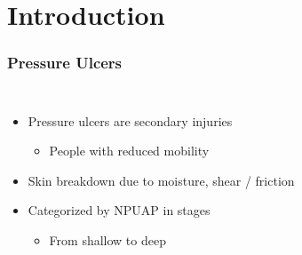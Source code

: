 \documentclass{beamer}
\begin{document}
	\section{Introduction}
		\begin{frame}
			\frametitle{Pressure Ulcers}
			\begin{columns}[c]
				\begin{itemize}
					\item Pressure ulcers are secondary injuries
					\begin{itemize}
						\item People with reduced mobility
					\end{itemize}

					\item Skin breakdown due to moisture, shear / friction

					\item Categorized by NPUAP in stages
					\begin{itemize}
						\item From shallow to deep
					\end{itemize}
				\end{itemize}

					\begin{figure}
						\centering


\end{figure}
\end{columns}
\end{frame}
\end{document}
